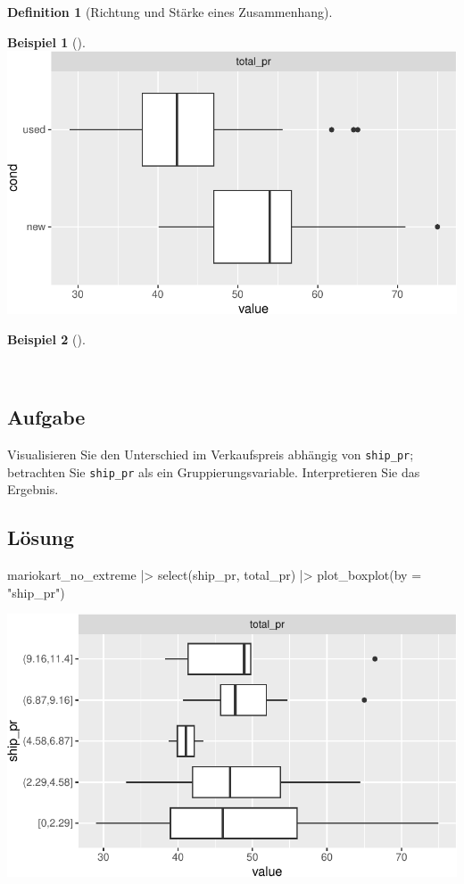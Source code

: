\documentclass[
  a4paper,
  DIV=11]{scrreprt}
\newenvironment{Shaded}{\begin{snugshade}}{\end{snugshade}}
\newcommand{\AttributeTok}[1]{\textcolor[rgb]{0.40,0.45,0.13}{#1}}
\newcommand{\FunctionTok}[1]{\textcolor[rgb]{0.28,0.35,0.67}{#1}}
\newcommand{\NormalTok}[1]{\textcolor[rgb]{0.00,0.23,0.31}{#1}}
\newcommand{\SpecialCharTok}[1]{\textcolor[rgb]{0.37,0.37,0.37}{#1}}
\newcommand{\StringTok}[1]{\textcolor[rgb]{0.13,0.47,0.30}{#1}}
\theoremstyle{definition}
\theoremstyle{definition}
\newtheorem{example}{Beispiel}[chapter]
\theoremstyle{definition}
\newtheorem{definition}{Definition}[chapter]
\theoremstyle{remark}
\begin{document}
\begin{definition}[Richtung und Stärke eines
Zusammenhang]
\begin{example}[]
\includegraphics{040-verbildlichen_files/figure-pdf/unnamed-chunk-40-1.pdf}

\end{example}

\begin{example}[]\protect\hypertarget{exm-diff-plot}{}\label{exm-diff-plot}

~

\subsection{Aufgabe}

Visualisieren Sie den Unterschied im Verkaufspreis abhängig von
\texttt{ship\_pr}; betrachten Sie \texttt{ship\_pr} als ein
Gruppierungsvariable. Interpretieren Sie das Ergebnis.

\subsection{Lösung}

\begin{Shaded}
\begin{Highlighting}[]
\NormalTok{mariokart\_no\_extreme }\SpecialCharTok{|\textgreater{}} 
  \FunctionTok{select}\NormalTok{(ship\_pr, total\_pr) }\SpecialCharTok{|\textgreater{}} 
  \FunctionTok{plot\_boxplot}\NormalTok{(}\AttributeTok{by =} \StringTok{"ship\_pr"}\NormalTok{)}
\end{Highlighting}
\end{Shaded}

\includegraphics{040-verbildlichen_files/figure-pdf/unnamed-chunk-41-1.pdf}


\end{example}
\end{definition}
\end{document}
